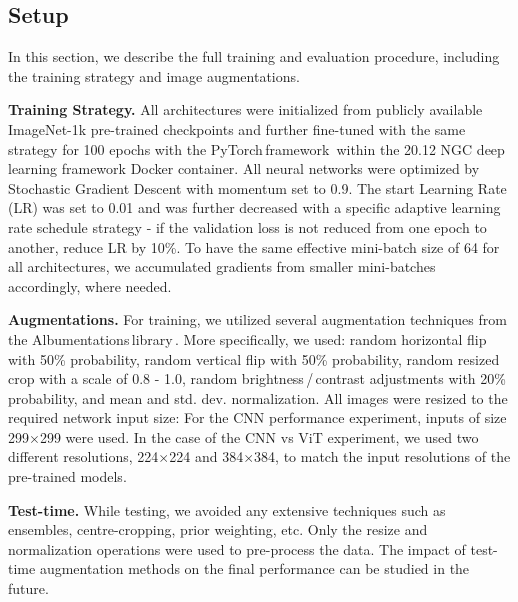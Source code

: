 \documentclass[10pt,twocolumn,letterpaper]{article}
\begin{document}
\subsection{Setup}
\label{setup}

In this section, we describe the full training and evaluation procedure, including the training strategy and image augmentations.

\textbf{Training Strategy.} All architectures were initialized from publicly available ImageNet-1k pre-trained checkpoints and further fine-tuned with the same strategy for 100 epochs with the PyTorch\,framework\,\cite{PyTorch} within the 20.12 NGC deep learning framework Docker container. All neural networks were optimized by Stochastic Gradient Descent with momentum set to 0.9. The start Learning Rate (LR) was set to 0.01 and was further decreased with a specific adaptive learning rate schedule strategy - if the validation loss is not reduced from one epoch to another, reduce LR by 10\%. To have the same effective mini-batch size of 64 for all architectures, we accumulated gradients from smaller mini-batches accordingly, where needed.

\textbf{Augmentations.} For training, we utilized several augmentation techniques from the Albumentations\,library\,\cite{albumentation}. More specifically, we used: random horizontal flip with 50\% probability, random vertical flip with 50\% probability, random resized crop with a scale of 0.8 - 1.0, random brightness\,/\,contrast adjustments with 20\% probability, and mean and std. dev. normalization. All images were resized to the required network input size: For the CNN performance experiment, inputs of size 299$\times$299 were used. In the case of the CNN vs ViT experiment, we used two different resolutions, 224$\times$224 and 384$\times$384, to match the input resolutions of the pre-trained models.

\textbf{Test-time.} While testing, we avoided any extensive techniques such as ensembles, centre-cropping, prior weighting, etc. Only the resize and normalization operations were used to pre-process the data. The impact of test-time augmentation methods on the final performance can be studied in the future.
\end{document}
